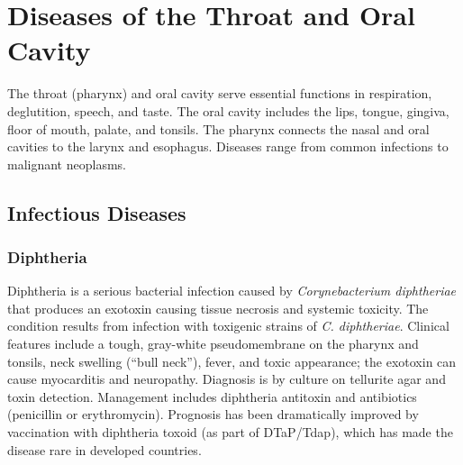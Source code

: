 \chapter{Diseases of the Throat and Oral Cavity}
\label{ch:throat}
The throat (pharynx) and oral cavity serve essential functions in respiration, deglutition, speech, and taste. The oral cavity includes the lips, tongue, gingiva, floor of mouth, palate, and tonsils. The pharynx connects the nasal and oral cavities to the larynx and esophagus. Diseases range from common infections to malignant neoplasms.

\section{Infectious Diseases}








\label{sec:Infectious Diseases}

\subsection{Diphtheria}
\label{sec:throat:Diphtheria}
Diphtheria is a serious bacterial infection caused by \textit{Corynebacterium diphtheriae} that produces an exotoxin causing tissue necrosis and systemic toxicity. The condition results from infection with toxigenic strains of \textit{C. diphtheriae}. Clinical features include a tough, gray-white pseudomembrane on the pharynx and tonsils, neck swelling (``bull neck''), fever, and toxic appearance; the exotoxin can cause myocarditis and neuropathy. Diagnosis is by culture on tellurite agar and toxin detection. Management includes diphtheria antitoxin and antibiotics (penicillin or erythromycin). Prognosis has been dramatically improved by vaccination with diphtheria toxoid (as part of DTaP/Tdap), which has made the disease rare in developed countries.


